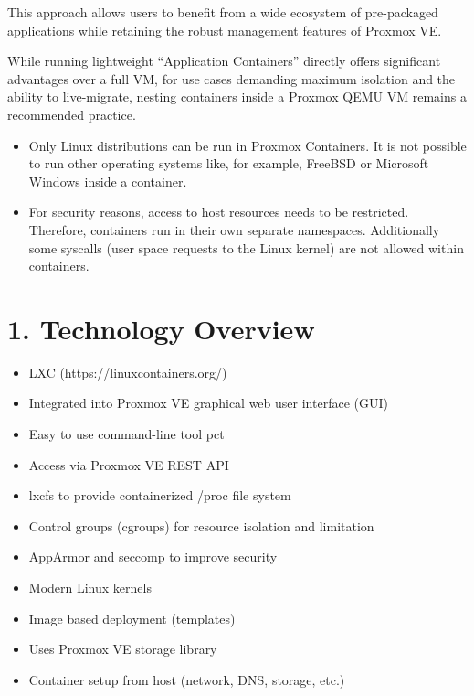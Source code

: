 This approach allows users to benefit from a wide ecosystem of pre-packaged applications while retaining the robust management features of Proxmox VE.

While running lightweight “Application Containers” directly offers significant advantages over a full VM, for use cases demanding maximum isolation and the ability to live-migrate, nesting containers inside a Proxmox QEMU VM remains a recommended practice.

\begin{itemize}[leftmargin=2cm]

	\item Only Linux distributions can be run in Proxmox Containers. It is not possible to run other operating systems like, for example, FreeBSD or Microsoft Windows inside a container.

	\item For security reasons, access to host resources needs to be restricted. Therefore, containers run in their own separate namespaces. Additionally some syscalls (user space requests to the Linux kernel) are not allowed within containers.

\end{itemize}


\section{1. Technology Overview}

\begin{itemize}[leftmargin=2cm]

	\item LXC (https://linuxcontainers.org/)

	\item Integrated into Proxmox VE graphical web user interface (GUI)

	\item Easy to use command-line tool pct

	\item Access via Proxmox VE REST API

	\item lxcfs to provide containerized /proc file system

	\item Control groups (cgroups) for resource isolation and limitation

	\item AppArmor and seccomp to improve security

	\item Modern Linux kernels

	\item Image based deployment (templates)

	\item Uses Proxmox VE storage library

	\item Container setup from host (network, DNS, storage, etc.)

\end{itemize}


